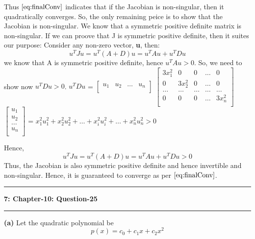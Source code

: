 \documentclass{article}
\newcommand\question[2]{\vspace{.25in}\hrule\textbf{#1: #2}\hrule\vspace{.10in}}
\renewcommand\part[1]{\vspace{.10in}\textbf{(#1)}}
\begin{document}
  Thus $\eqref{eq:finalConv}$ indicates that if the Jacobian is non-singular, then it quadratically converges. So, the only remaining peice is to show that the Jacobian is non-singular. We know that a symmetric positive definite matrix is non-singular. If we can proove that J is symmetric positive definite, then it suites our purpose: Consider any non-zero vector, \textbf {u}, then:
  \[u^T J u = u^T (A + D) u = u^TAu + u^TDu\]
  we know that A is symmetric positive definite, hence $u^TAu > 0$. So, we need to show now $u^TDu > 0$. \newline
  $u^TDu$ = $\begin{bmatrix}
	       u_1 & u_2 & \dots & u_n \\
	    \end{bmatrix}$ $\begin{bmatrix}
		    		3x_1^2 & 0 & 0 & \dots & 0 \\
				0 & 3x_2^2 & 0 & \dots & 0 \\
				\dots & \dots & \dots & \dots & \dots \\
				0 & 0 & 0 & \dots & 3x_n^2 \\
			    \end{bmatrix}$ $\begin{bmatrix}
				    		u_1 \\
						u_2 \\
						\dots \\
						u_n \\
				    	   \end{bmatrix}$ = $x_1^2u_1^2 + x_2^2u_2^2 + \dots + x_i^2u_i^2 + \dots + x_n^2u_n^2 > 0$ \newline

  Hence,
  \[u^T J u = u^T (A + D) u = u^TAu + u^TDu > 0\]
  Thus, the Jacobian is also symmetric positive definite and hence invertible and non-singular. Hence, it is guaranteed to converge as per $\eqref{eq:finalConv}$. \newline
	  	  

 




\question{7}{Chapter-10: Question-25}

\part{a} Let the quadratic polynomial be 
\begin{equation}
	p(x) = c_0 + c_1 x + c_2 x^2
	\label{eq:quad}
\end{equation}
\end{document}
